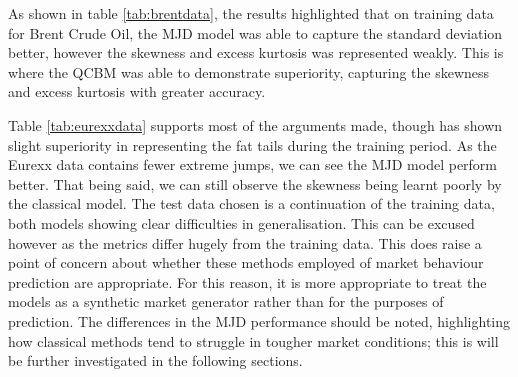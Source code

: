 \documentclass[12pt]{article}
\newcommand{\newp}
    {
    \vskip 0.5cm 
  }
\numberwithin{equation}{section}
\begin{document}
As shown in table \ref{tab:brentdata}, the results highlighted that on training data 
for Brent Crude Oil, the 
MJD model was able to capture the standard deviation better, however the skewness 
and excess kurtosis was represented weakly. This is where the QCBM was able to 
demonstrate superiority, 
capturing the skewness and excess kurtosis with greater accuracy.
\newp 
Table \ref{tab:eurexxdata} supports most of the arguments made, though has shown 
slight superiority in representing the fat tails during the training period. 
As the Eurexx data contains fewer extreme jumps, we can see the MJD model perform 
better. That being said, we can still observe the skewness being learnt poorly
by the classical model. The test data chosen is a continuation of the training data,
both models showing clear difficulties in generalisation. This can be excused however 
as the metrics differ hugely from the training data. This does raise a point of 
concern about whether these methods employed of market behaviour prediction are 
appropriate. For this reason, it is more appropriate to treat the models as a 
synthetic market generator rather than for the purposes of prediction. The differences 
in the MJD performance should be noted, highlighting how classical methods 
tend to struggle in tougher market conditions; this is will be further investigated 
in the following sections.
\end{document}
